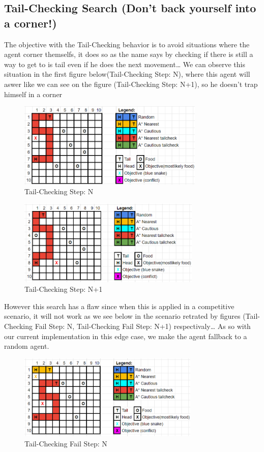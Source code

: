 \subsection{Tail-Checking Search (Don't back yourself into a corner!)}

The objective with the Tail-Checking behavior is to avoid situations where the agent corner themselfs, it does so as the name says by checking if there is still a way to get to is tail even if he does the next movement\dots
We can observe this situation in the first figure below(Tail-Checking Step: N), where this agent will aswer like we can see on the figure (Tail-Checking Step: N+1), so he doesn't trap himself in a corner  


\begin{figure}
\includegraphics[height=1.6in]{D1}
\caption{Tail-Checking Step: N}
\end{figure}

\begin{figure}
\includegraphics[height=1.6in]{D2}
\caption{Tail-Checking Step: N+1}
\end{figure}

However this search has a flaw since when this is applied in a competitive scenario, it will not work as we see below in the scenario retrated by figures (Tail-Checking Fail Step: N, Tail-Checking Fail Step: N+1) respectivaly\dots
As so with our current implementation in this edge case, we make the agent fallback to a random agent.
  

\begin{figure}
\includegraphics[height=1.6in]{E1}
\caption{Tail-Checking Fail Step: N}
\end{figure}

